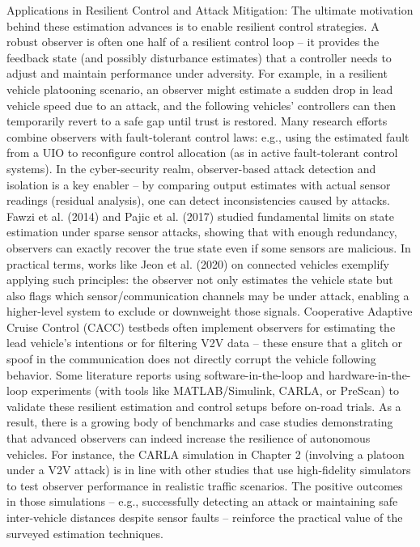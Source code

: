 Applications in Resilient Control and Attack Mitigation: The ultimate motivation behind these estimation advances is to enable resilient control strategies. A robust observer is often one half of a resilient control loop – it provides the feedback state (and possibly disturbance estimates) that a controller needs to adjust and maintain performance under adversity. For example, in a resilient vehicle platooning scenario, an observer might estimate a sudden drop in lead vehicle speed due to an attack, and the following vehicles’ controllers can then temporarily revert to a safe gap until trust is restored. Many research efforts combine observers with fault-tolerant control laws: e.g., using the estimated fault from a UIO to reconfigure control allocation (as in active fault-tolerant control systems). In the cyber-security realm, observer-based attack detection and isolation is a key enabler – by comparing output estimates with actual sensor readings (residual analysis), one can detect inconsistencies caused by attacks. Fawzi et al. (2014) and Pajic et al. (2017) studied fundamental limits on state estimation under sparse sensor attacks, showing that with enough redundancy, observers can exactly recover the true state even if some sensors are malicious. In practical terms, works like Jeon et al. (2020) on connected vehicles exemplify applying such principles: the observer not only estimates the vehicle state but also flags which sensor/communication channels may be under attack, enabling a higher-level system to exclude or downweight those signals. Cooperative Adaptive Cruise Control (CACC) testbeds often implement observers for estimating the lead vehicle’s intentions or for filtering V2V data – these ensure that a glitch or spoof in the communication does not directly corrupt the vehicle following behavior. Some literature reports using software-in-the-loop and hardware-in-the-loop experiments (with tools like MATLAB/Simulink, CARLA, or PreScan) to validate these resilient estimation and control setups before on-road trials. As a result, there is a growing body of benchmarks and case studies demonstrating that advanced observers can indeed increase the resilience of autonomous vehicles. For instance, the CARLA simulation in Chapter 2 (involving a platoon under a V2V attack) is in line with other studies that use high-fidelity simulators to test observer performance in realistic traffic scenarios. The positive outcomes in those simulations – e.g., successfully detecting an attack or maintaining safe inter-vehicle distances despite sensor faults – reinforce the practical value of the surveyed estimation techniques.


